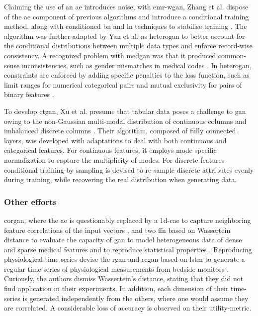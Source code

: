             Claiming the use of an \gls{ae} introduces noise, with \gls{emr-wgan}, Zhang et al. dispose of the \gls{ae} component of previous algorithms and introduce a conditional training method, along with conditioned \gls{bn} and \gls{ln} techniques to stabilise training \cite{Zhang2020}. The algorithm was further adapted by Yan et al. as \gls{heterogan} to better account for the conditional distributions between multiple data types and enforce record-wise consistency. A recognized problem with \gls{medgan} was that it produced common-sense inconsistencies, such as gender mismatches in medical codes \cite{yan2020generating, Choi2017-nt}. In \gls{heterogan}, constraints are enforced by adding specific penalties to the loss function, such as limit ranges for numerical categorical pairs and mutual exclusivity for pairs of binary features \cite{yan2020generating}. \par

            To develop \gls{ctgan}, Xu et al. presume that tabular data poses a challenge to \gls{gan} owing to the non-Gaussian multi-modal distribution of continuous columns and imbalanced discrete columns \cite{Xu2019-ay}. Their algorithm, composed of fully connected layers, was developed with adaptations to deal with both continuous and categorical features. For continuous features, it employs mode-specific normalization to capture the multiplicity of modes. For discrete features conditional training-by sampling is devised to re-sample discrete attributes evenly during training, while recovering the real distribution when generating data.\par

        \subsubsection{Other efforts}
            
            \gls{corgan}, where the \gls{ae} is questionably replaced by a \gls{1d-cae} to capture neighboring feature correlations of the input vectors \cite{torfi2019generating}, and two \gls{ffn} based on Wassertein distance to evaluate the capacity of \gls{gan} to model heterogeneous data of dense and sparse medical features \cite{chincheong2020generation} and to reproduce statistical properties \cite{ozyigit2020generation}. Reproducing physiological time-series \citeauthor{esteban2017real} devise the \gls{rgan} and \gls{rcgan} based on \gls{lstm} to generate a regular time-series of physiological measurements from bedside monitors \cite{esteban2017real}. Curiously, the authors dismiss Wassertein's distance, stating that they did not find application in their experiments. In addition, each dimension of their time-series is generated independently from the others, where one would assume they are correlated. A considerable loss of accuracy is observed on their \gls{utility-metric}.

